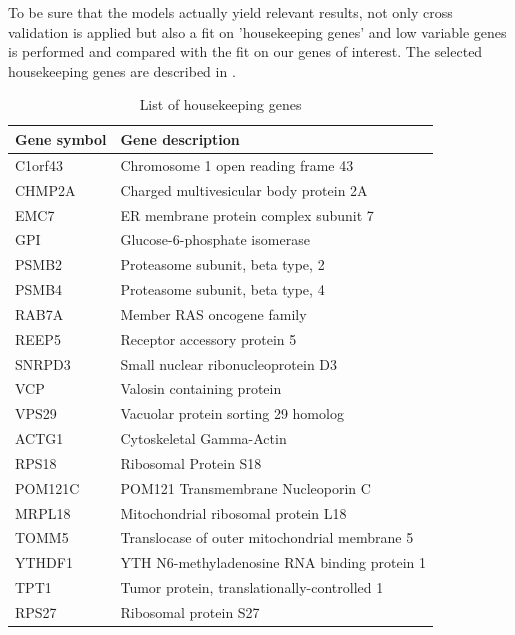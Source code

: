 \documentclass[journal]{IEEEtran}
\begin{document}
To be sure that the models actually yield relevant results, not only cross validation is applied but also a fit on 'housekeeping genes' and low variable genes is performed and compared with the fit on our genes of interest. The selected housekeeping genes are described in .
\begin{table}[h!]
    \centering
    \begin{tabularx}{\linewidth}{| X |  X |}
        \hline
        \textbf{Gene symbol} &  \textbf{Gene description} \\ \hline \hline
        C1orf43 & Chromosome 1 open reading frame 43 \\ \hline
        CHMP2A & Charged multivesicular body protein 2A\\ \hline
        EMC7  & ER membrane protein complex subunit 7\\ \hline
        GPI & Glucose-6-phosphate isomerase \\ \hline
        PSMB2 & Proteasome subunit, beta type, 2 \\ \hline
        PSMB4 & Proteasome subunit, beta type, 4\\ \hline
        RAB7A & Member RAS oncogene family \\ \hline
        REEP5 & Receptor accessory protein 5 \\ \hline
        SNRPD3 & Small nuclear ribonucleoprotein D3 \\ \hline
        VCP & Valosin containing protein \\ \hline
        VPS29 & Vacuolar protein sorting 29 homolog \\ \hline
        ACTG1 & Cytoskeletal Gamma-Actin \\ \hline
        RPS18 & Ribosomal Protein S18  \\ \hline
        POM121C & POM121 Transmembrane Nucleoporin C  \\ \hline
        MRPL18 & Mitochondrial ribosomal protein L18  \\ \hline
        TOMM5 & Translocase of outer mitochondrial membrane 5  \\ \hline
        YTHDF1 & YTH N6-methyladenosine RNA binding protein 1  \\ \hline
        TPT1 & Tumor protein, translationally-controlled 1\\ \hline
        RPS27 & Ribosomal protein S27\\ \hline
    \end{tabularx}
\caption{List of housekeeping genes}\label{table:housekeeping_genes_list}
\end{table}
\end{document}

